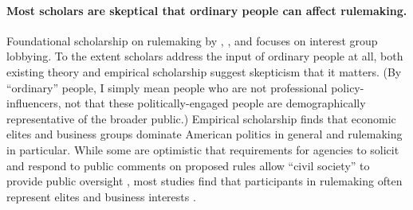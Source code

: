 \paragraph{Most scholars are skeptical that ordinary people can affect rulemaking.} Foundational scholarship on rulemaking by \citet{Furlong2004}, \citet{Furlong1997, Furlong1998}, and \citet{Kerwin2011} focuses on interest group lobbying. To the extent scholars address the input of ordinary people %
at all, both existing theory and empirical scholarship suggest skepticism that it matters. (By ``ordinary'' people, I simply mean people who are not professional policy-influencers, not that these politically-engaged people are demographically representative of the broader public.)
Empirical scholarship finds that economic elites and business groups dominate American politics in general \citep{Gilens2014} and rulemaking in particular. %
While some are optimistic that requirements for agencies to solicit and respond to public comments on proposed rules allow ``civil society'' to provide public oversight \citep{Michaels2015, Metzger2010}, most studies find that participants in rulemaking often represent elites and business interests \citep{Seifter2016UCLA, Crow2015, Wagner2011, West2009, Yackee2006JOP, Yackee2006JPART, Golden1998, Haeder2015, Cook2017}.%

